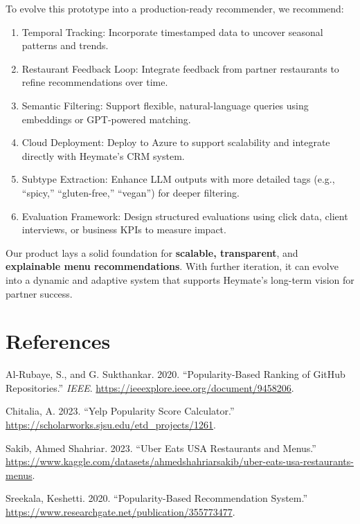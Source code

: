 \documentclass[
  11pt,
  a4paper,
  DIV=11,
  numbers=noendperiod]{scrartcl}
\providecommand{\tightlist}{%
  \setlength{\itemsep}{0pt}\setlength{\parskip}{0pt}}\usepackage{longtable,booktabs,array}
\newlength{\cslhangindent}
\newenvironment{CSLReferences}[2] %
 {\begin{list}{}{%
  \setlength{\itemindent}{0pt}
  \setlength{\leftmargin}{0pt}
  \setlength{\parsep}{0pt}
  \ifodd #1
   \setlength{\leftmargin}{\cslhangindent}
   \setlength{\itemindent}{-1\cslhangindent}
  \fi
  \setlength{\itemsep}{#2\baselineskip}}}
 {\end{list}}
\begin{document}
To evolve this prototype into a production-ready recommender, we
recommend:

\begin{enumerate}
\def\labelenumi{\arabic{enumi}.}
\tightlist
\item
  Temporal Tracking: Incorporate timestamped data to uncover seasonal
  patterns and trends.
\item
  Restaurant Feedback Loop: Integrate feedback from partner restaurants
  to refine recommendations over time.
\item
  Semantic Filtering: Support flexible, natural-language queries using
  embeddings or GPT-powered matching.
\item
  Cloud Deployment: Deploy to Azure to support scalability and integrate
  directly with Heymate's CRM system.
\item
  Subtype Extraction: Enhance LLM outputs with more detailed tags (e.g.,
  ``spicy,'' ``gluten-free,'' ``vegan'') for deeper filtering.
\item
  Evaluation Framework: Design structured evaluations using click data,
  client interviews, or business KPIs to measure impact.
\end{enumerate}

Our product lays a solid foundation for \textbf{scalable, transparent},
and \textbf{explainable menu recommendations}. With further iteration,
it can evolve into a dynamic and adaptive system that supports Heymate's
long-term vision for partner success.

\newpage{}

\section*{References}\label{references}

\label{refs}
\begin{CSLReferences}{1}{0}
Al-Rubaye, S., and G. Sukthankar. 2020. {``Popularity-Based Ranking of
GitHub Repositories.''} \emph{IEEE}.
\url{https://ieeexplore.ieee.org/document/9458206}.

Chitalia, A. 2023. {``Yelp Popularity Score Calculator.''}
\url{https://scholarworks.sjsu.edu/etd_projects/1261}.

Sakib, Ahmed Shahriar. 2023. {``Uber Eats USA Restaurants and Menus.''}
\url{https://www.kaggle.com/datasets/ahmedshahriarsakib/uber-eats-usa-restaurants-menus}.

Sreekala, Keshetti. 2020. {``Popularity-Based Recommendation System.''}
\url{https://www.researchgate.net/publication/355773477}.

\end{CSLReferences}
\end{document}
